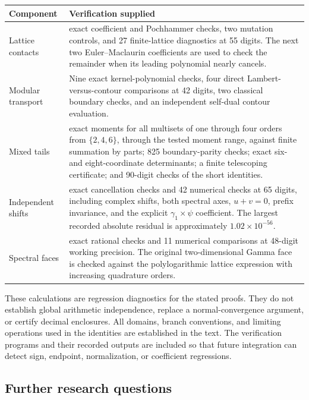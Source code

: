 \documentclass[11pt,letterpaper]{article}
\numberwithin{equation}{section}
\theoremstyle{definition}
\theoremstyle{remark}
\begin{document}
\begin{longtable}{@{}>{\raggedright\arraybackslash}p{}>{\raggedright\arraybackslash}p{}@{}}
\toprule
\textbf{Component} & \textbf{Verification supplied}\\
\midrule
\endhead
Lattice contacts
&
60 exact coefficient and Pochhammer checks, two mutation
controls, and 27 finite-lattice diagnostics at 55 digits.
The next two Euler--Maclaurin coefficients are used to check
the remainder when its leading polynomial nearly cancels.\\[4pt]
Modular transport
&
Nine exact kernel-polynomial checks, four direct
Lambert-versus-contour comparisons at 42 digits,
two classical boundary checks, and an independent
self-dual contour evaluation.\\[4pt]
Mixed tails
&
306 exact moments for all multisets of one through four
orders from \(\{2,4,6\}\), through the tested moment range,
against finite summation by parts; 825 boundary-parity
checks; exact six- and eight-coordinate determinants;
a finite telescoping certificate; and 90-digit checks
of the short identities.\\[4pt]
Independent shifts
&
16 exact cancellation checks and 42 numerical checks
at 65 digits, including complex shifts, both spectral
axes, \(u+v=0\), prefix invariance, and the explicit
\(\gamma_1\times\psi\) coefficient.
The largest recorded absolute residual is approximately
\(1.02\times10^{-56}\).\\[4pt]
Spectral faces
&
34 exact rational checks and 11 numerical comparisons
at 48-digit working precision. The original
two-dimensional Gamma face is checked against the
polylogarithmic lattice expression with increasing
quadrature orders.\\
\bottomrule
\end{longtable}

These calculations are regression diagnostics for the stated
proofs. They do not establish global arithmetic independence,
replace a normal-convergence argument, or certify decimal
enclosures. All domains, branch conventions, and limiting
operations used in the identities are established in the text.
The verification programs and their recorded outputs are
included so that future integration can detect sign, endpoint,
normalization, or coefficient regressions.

\subsection{Further research questions}
\label{sec:questions}
\end{document}
